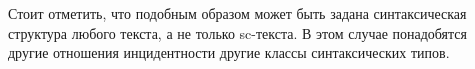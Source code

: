 \begin{SCn}
{Стоит отметить, что подобным образом может быть задана синтаксическая структура любого текста, а не только sc-текста. В этом случае понадобятся другие отношения инцидентности другие классы синтаксических типов.}

\scnendstruct \scnendcurrentsectioncomment

\end{SCn}